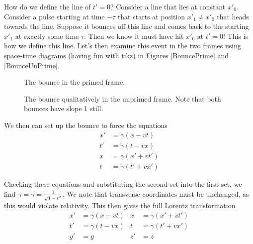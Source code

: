 \documentclass[10pt]{report}
\begin{document}
How do we define the line of $t' = 0$? Consider a line that lies at constant $x'_0$. Consider a pulse starting at time $-\tau$ that starts at position $x'_1 \neq x'_0$ that heads towards the line. Suppose it bounces off this line and comes back to the starting $x'_1$ at exactly some time $\tau$. Then we know it must have hit $x'_0$ at $t'=0$! This is how we define this line. Let's then examine this event in the two frames using space-time diagrams (having fun with tikz) in Figures \eqref{BouncePrime} and \eqref{BounceUnPrime}.
\begin{figure}[!h]
    \centering
    \caption{The bounce in the primed frame.}
    \label{BouncePrime}
\end{figure}
\begin{figure}[!h]
    \centering
    \caption{The bounce qualitatively in the unprimed frame. Note that both bounces have slope 1 still.}
    \label{BounceUnPrime}
\end{figure}

We then can set up the bounce to force the equations
\begin{align}
    x' &= \gamma(x-vt)\\
    t' &= \tilde{\gamma}(t-vx)\\
    x &= \gamma(x' + vt')\\
    t &= \tilde{\gamma}(t' + vx')
    \label{LorentzDeriv}
\end{align}

Checking these equations and substituting the second set into the first set, we find $\gamma = \tilde{\gamma} = \frac{1}{\sqrt{1-v^2}}$. We note that transverse coordinates must be unchanged, as this would violate relativity. This then gives the full Lorentz transformation
\begin{align}
    x' &= \gamma(x-vt) & x &= \gamma(x' + vt')\\
    t' &= \gamma(t-vx) & t &= \gamma(t' + vx')\\
    y' &= y & z' &= z
    \label{Lorentz}
\end{align}
\end{document}
